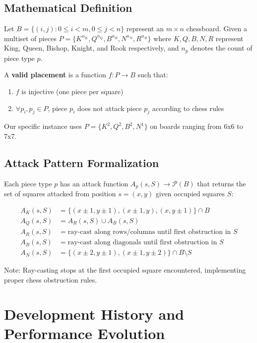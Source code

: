 \documentclass[12pt,a4paper]{article}
\theoremstyle{definition}
\begin{document}
\subsection{Mathematical Definition}

Let $B = \{(i,j) : 0 \leq i < m, 0 \leq j < n\}$ represent an $m \times n$ chessboard. Given a multiset of pieces $P = \{K^{n_K}, Q^{n_Q}, B^{n_B}, N^{n_N}, R^{n_R}\}$ where $K, Q, B, N, R$ represent King, Queen, Bishop, Knight, and Rook respectively, and $n_p$ denotes the count of piece type $p$.

A \textbf{valid placement} is a function $f: P \rightarrow B$ such that:
\begin{enumerate}
\item $f$ is injective (one piece per square)
\item $\forall p_i, p_j \in P$, piece $p_i$ does not attack piece $p_j$ according to chess rules
\end{enumerate}

Our specific instance uses $P = \{K^2, Q^2, B^2, N^1\}$ on boards ranging from 6x6 to 7x7.

\subsection{Attack Pattern Formalization}

Each piece type $p$ has an attack function $A_p(s, S) \rightarrow \mathcal{P}(B)$ that returns the set of squares attacked from position $s=(x,y)$ given occupied squares $S$:

\begin{align}
A_K(s, S) &= \{(x \pm 1, y \pm 1), (x \pm 1, y), (x, y \pm 1)\} \cap B \\
A_Q(s, S) &= A_R(s, S) \cup A_B(s, S) \\
A_R(s, S) &= \text{ray-cast along rows/columns until first obstruction in } S \\
A_B(s, S) &= \text{ray-cast along diagonals until first obstruction in } S \\
A_N(s, S) &= \{(x \pm 2, y \pm 1), (x \pm 1, y \pm 2)\} \cap B \setminus S
\end{align}

Note: Ray-casting stops at the first occupied square encountered, implementing proper chess obstruction rules.

\section{Development History and Performance Evolution}
\end{document}
